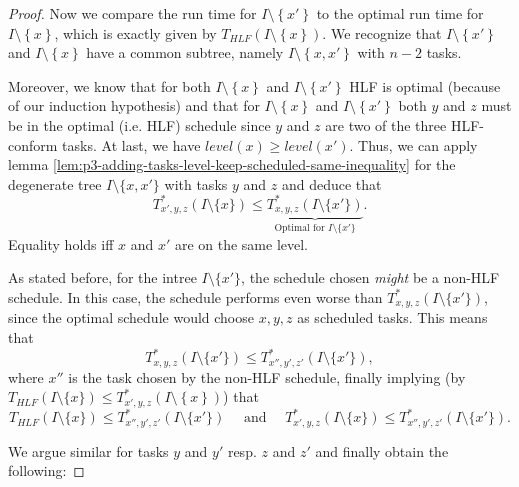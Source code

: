 \begin{proof}
  Now we compare the run time for $I\setminus\left\{ x' \right\}$ to the optimal run time for $I \setminus\left\{ x \right\}$, which is exactly given by $T_{HLF}\left( I \setminus\left\{ x \right\} \right)$. We recognize that $I\setminus\left\{ x' \right\}$ and $I\setminus\left\{ x \right\}$ have a common subtree, namely $I\setminus\left\{ x,x' \right\}$ with $n-2$ tasks.
  
  Moreover, we know that for both $I\setminus\left\{ x \right\}$ and $I\setminus\left\{ x' \right\}$ HLF is optimal (because of our induction hypothesis) and that for $I\setminus\left\{ x \right\}$ and $I\setminus\left\{ x' \right\}$ both $y$ and $z$ must be in the optimal (i.e. HLF) schedule since $y$ and $z$ are two of the three HLF-conform tasks. At last, we have $level(x) \geq level(x')$.
  Thus, we can apply lemma \ref{lem:p3-adding-tasks-level-keep-scheduled-same-inequality} for the degenerate tree $I\setminus \{x,x'\}$ with tasks $y$ and $z$ and deduce that
  \begin{equation*}
    T^*_{x',y,z}(I\setminus\{x\}) 
    \leq 
    \underbrace{T^*_{x,y,z}(I\setminus\{x'\})}_{\text{Optimal for $I\setminus \{x'\}$}}.
  \end{equation*}
  Equality holds iff $x$ and $x'$ are on the same level.

  As stated before, for the intree $I\setminus\{x'\}$, the schedule chosen \emph{might} be a non-HLF schedule. In this case, the schedule performs even worse than $T^*_{x,y,z}(I\setminus\{ x'  \})$, since the optimal schedule would choose $x,y,z$ as scheduled tasks. This means that
  \begin{equation*}
    T^*_{x,y,z}(I\setminus\{x'\})
    \leq
    T^*_{x'',y',z'}(I\setminus\{x'\}),
  \end{equation*}
  where $x''$ is the task chosen by the non-HLF schedule, finally implying (by $T_{HLF}(I\setminus\{x\}) \leq T^*_{x',y,z}\left( I\setminus\left\{ x \right\} \right)$) that
  \begin{equation*}
    T_{HLF}(I\setminus\{x\})
    \leq
    T^*_{x'',y',z'}(I\setminus\{x'\})
    \quad
    \text{ and }
    \quad
    T^*_{x',y,z}(I\setminus\{x\})
    \leq
    T^*_{x'',y',z'}(I\setminus\{x'\})
    .
  \end{equation*}
  
  We argue similar for tasks $y$ and $y'$ resp. $z$ and $z'$ and finally obtain the following:


\end{proof}
